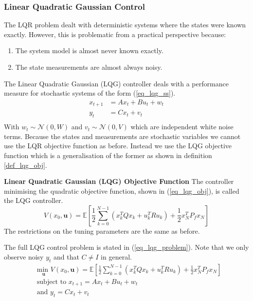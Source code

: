 \subsubsection{Linear Quadratic Gaussian Control}
\label{sec_lqg_lit}
The LQR problem dealt with deterministic systems where the states were known exactly. However, this is problematic from a practical perspective because:
\begin{enumerate}
\item
The system model is almost never known exactly.
\item
The state measurements are almost always noisy.
\end{enumerate}
The Linear Quadratic Gaussian (LQG) controller deals with a performance measure for stochastic systems of the form (\ref{eq_lqg_ss}).
\begin{equation}
\begin{aligned}
x_{t+1} &= Ax_t+ Bu_t + w_t \\
y_t &= Cx_t +v_t \\
\end{aligned}
\label{eq_lqg_ss}
\end{equation}
With  $w_t \sim \mathcal{N}(0, W)$ and $v_t \sim \mathcal{N}(0, V)$ which are independent white noise terms. 
Because the states and measurements are stochastic variables we cannot use the LQR objective function as before. Instead we use the LQG objective function which is a generalisation of the former as shown in definition \ref{def_lqg_obj}.
\begin{defn}
\textbf{Linear Quadratic Gaussian (LQG) Objective Function} The controller minimising the quadratic objective function, shown in (\ref{eq_lqg_obj}), is called the LQG controller. 
\begin{equation}
V(x_0, \mathbf{u}) = \mathbb{E}\left[ \frac{1}{2}\sum_{k=0}^{N-1} \left( x_k^TQx_k + u_k^TRu_k \right) + \frac{1}{2}x_N^TP_fx_N \right]
\label{eq_lqg_obj}
\end{equation}
The restrictions on the tuning parameters are the same as before.
\label{def_lqg_obj}
\end{defn}
The full LQG control problem is stated in (\ref{eq_lqg_problem}). Note that we only observe noisy $y_t$ and that $C \neq I$ in general.
\begin{equation}
\begin{aligned}
&\underset{\mathbf{u}}{\text{min }} V(x_0, \mathbf{u}) = \mathbb{E}\left[ \frac{1}{2}\sum_{k=0}^{N-1} \left( x_k^TQx_k + u_k^TRu_k \right) + \frac{1}{2}x_N^TP_fx_N \right] \\
& \text{subject to } x_{t+1}=Ax_t+Bu_t + w_t \\
& \text{and } y_{t}= Cx_t + v_t \\
\end{aligned}
\label{eq_lqg_problem}
\end{equation}


